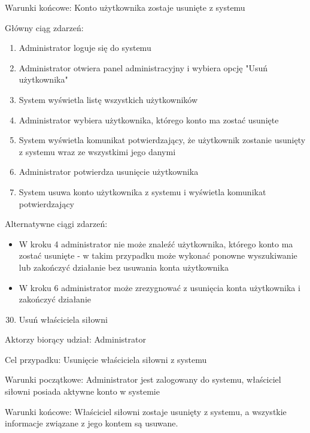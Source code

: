 \documentclass[
]{article}
\providecommand{\tightlist}{%
  \setlength{\itemsep}{0pt}\setlength{\parskip}{0pt}}
\begin{document}
{Warunki końcowe: Konto użytkownika zostaje usunięte z systemu}

{Główny ciąg zdarzeń:}

\begin{enumerate}
\tightlist
\item
  {Administrator loguje się do systemu}
\item
  {Administrator otwiera panel administracyjny i wybiera opcję "Usuń
  użytkownika"}
\item
  {System wyświetla listę wszystkich użytkowników}
\item
  {Administrator wybiera użytkownika, którego konto ma zostać usunięte}
\item
  {System wyświetla komunikat potwierdzający, że użytkownik zostanie
  usunięty z systemu wraz ze wszystkimi jego danymi}
\item
  {Administrator potwierdza usunięcie użytkownika}
\item
  {System usuwa konto użytkownika z systemu i wyświetla komunikat
  potwierdzający}
\end{enumerate}

{Alternatywne ciągi zdarzeń:}

\begin{itemize}
\tightlist
\item
  {W kroku 4 administrator nie może znaleźć użytkownika, którego konto
  ma zostać usunięte - w takim przypadku może wykonać ponowne
  wyszukiwanie lub zakończyć działanie bez usuwania konta użytkownika}
\item
  {W kroku 6 administrator może zrezygnować z usunięcia konta
  użytkownika i zakończyć działanie}
\end{itemize}

{}

{}

{}

\begin{enumerate}
\setcounter{enumi}{29}
\tightlist
\item
  {Usuń właściciela siłowni}
\end{enumerate}

{Aktorzy biorący udział: Administrator}

{Cel przypadku: Usunięcie właściciela siłowni z systemu}

{Warunki początkowe: Administrator jest zalogowany do systemu,
właściciel siłowni posiada aktywne konto w systemie}

{Warunki końcowe: Właściciel siłowni zostaje usunięty z systemu, a
wszystkie informacje związane z jego kontem są usuwane.}
\end{document}
